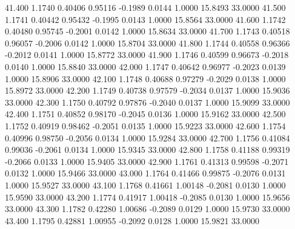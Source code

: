   41.400   1.1740   0.40406   0.95116  -0.1989   0.0144   1.0000  15.8493  33.0000
  41.500   1.1741   0.40442   0.95432  -0.1995   0.0143   1.0000  15.8564  33.0000
  41.600   1.1742   0.40480   0.95745  -0.2001   0.0142   1.0000  15.8634  33.0000
  41.700   1.1743   0.40518   0.96057  -0.2006   0.0142   1.0000  15.8704  33.0000
  41.800   1.1744   0.40558   0.96366  -0.2012   0.0141   1.0000  15.8772  33.0000
  41.900   1.1746   0.40599   0.96673  -0.2018   0.0140   1.0000  15.8840  33.0000
  42.000   1.1747   0.40642   0.96977  -0.2023   0.0139   1.0000  15.8906  33.0000
  42.100   1.1748   0.40688   0.97279  -0.2029   0.0138   1.0000  15.8972  33.0000
  42.200   1.1749   0.40738   0.97579  -0.2034   0.0137   1.0000  15.9036  33.0000
  42.300   1.1750   0.40792   0.97876  -0.2040   0.0137   1.0000  15.9099  33.0000
  42.400   1.1751   0.40852   0.98170  -0.2045   0.0136   1.0000  15.9162  33.0000
  42.500   1.1752   0.40919   0.98462  -0.2051   0.0135   1.0000  15.9223  33.0000
  42.600   1.1754   0.40996   0.98750  -0.2056   0.0134   1.0000  15.9284  33.0000
  42.700   1.1756   0.41084   0.99036  -0.2061   0.0134   1.0000  15.9345  33.0000
  42.800   1.1758   0.41188   0.99319  -0.2066   0.0133   1.0000  15.9405  33.0000
  42.900   1.1761   0.41313   0.99598  -0.2071   0.0132   1.0000  15.9466  33.0000
  43.000   1.1764   0.41466   0.99875  -0.2076   0.0131   1.0000  15.9527  33.0000
  43.100   1.1768   0.41661   1.00148  -0.2081   0.0130   1.0000  15.9590  33.0000
  43.200   1.1774   0.41917   1.00418  -0.2085   0.0130   1.0000  15.9656  33.0000
  43.300   1.1782   0.42280   1.00686  -0.2089   0.0129   1.0000  15.9730  33.0000
  43.400   1.1795   0.42881   1.00955  -0.2092   0.0128   1.0000  15.9821  33.0000
